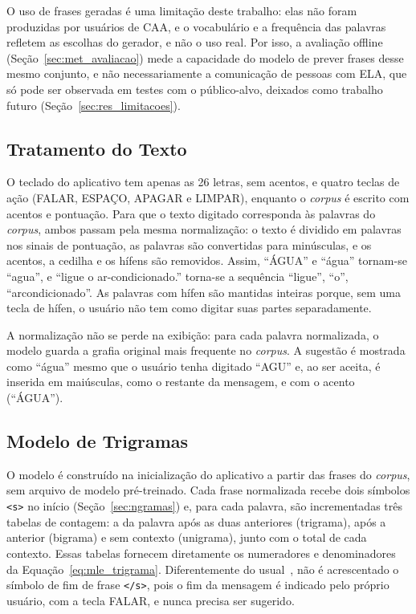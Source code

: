 O uso de frases geradas é uma limitação deste trabalho: elas não foram produzidas por usuários de \gls{CAA}, e o vocabulário e a frequência das palavras refletem as escolhas do gerador, e não o uso real. Por isso, a avaliação offline (Seção~\ref{sec:met_avaliacao}) mede a capacidade do modelo de prever frases desse mesmo conjunto, e não necessariamente a comunicação de pessoas com \gls{ELA}, que só pode ser observada em testes com o público-alvo, deixados como trabalho futuro (Seção~\ref{sec:res_limitacoes}).

\subsection{Tratamento do Texto} \label{sec:met_normalizacao}

O teclado do aplicativo tem apenas as 26 letras, sem acentos, e quatro teclas de ação (FALAR, ESPAÇO, APAGAR e LIMPAR), enquanto o \textit{corpus} é escrito com acentos e pontuação. Para que o texto digitado corresponda às palavras do \textit{corpus}, ambos passam pela mesma normalização: o texto é dividido em palavras nos sinais de pontuação, as palavras são convertidas para minúsculas, e os acentos, a cedilha e os hífens são removidos. Assim, ``ÁGUA'' e ``água'' tornam-se ``agua'', e ``ligue o ar-condicionado.'' torna-se a sequência ``ligue'', ``o'', ``arcondicionado''. As palavras com hífen são mantidas inteiras porque, sem uma tecla de hífen, o usuário não tem como digitar suas partes separadamente.

A normalização não se perde na exibição: para cada palavra normalizada, o modelo guarda a grafia original mais frequente no \textit{corpus}. A sugestão é mostrada como ``água'' mesmo que o usuário tenha digitado ``AGU'' e, ao ser aceita, é inserida em maiúsculas, como o restante da mensagem, e com o acento (``ÁGUA'').

\subsection{Modelo de Trigramas} \label{sec:met_modelo}

O modelo é construído na inicialização do aplicativo a partir das frases do \textit{corpus}, sem arquivo de modelo pré-treinado. Cada frase normalizada recebe dois símbolos \texttt{<s>} no início (Seção~\ref{sec:ngramas}) e, para cada palavra, são incrementadas três tabelas de contagem: a da palavra após as duas anteriores (trigrama), após a anterior (bigrama) e sem contexto (unigrama), junto com o total de cada contexto. Essas tabelas fornecem diretamente os numeradores e denominadores da Equação~\ref{eq:mle_trigrama}. Diferentemente do usual~\cite[cap.~3]{jurafsky2026slp}, não é acrescentado o símbolo de fim de frase \texttt{</s>}, pois o fim da mensagem é indicado pelo próprio usuário, com a tecla FALAR, e nunca precisa ser sugerido.

